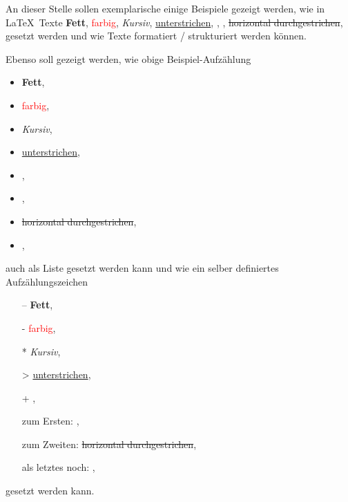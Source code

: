 An dieser Stelle sollen exemplarische einige Beispiele gezeigt werden, wie in \LaTeX\ Texte \textbf{Fett}, \textcolor{red}{farbig}, \textit{Kursiv}, \underline{unterstrichen}, , , \sout{horizontal durchgestrichen},  gesetzt werden und wie Texte formatiert / struk\-tu\-riert werden können.

Ebenso soll gezeigt werden, wie obige Beispiel-Aufzählung 

\begin{itemize}[topsep=0em, partopsep=0em, parsep=0em, itemsep=0em]
	\item \textbf{Fett}, 
	\item \textcolor{red}{farbig}, 
	\item \textit{Kursiv}, 
	\item \underline{unterstrichen}, 
	\item {}, 
	\item {}, 
	\item \sout{horizontal durchgestrichen}, 
	\item {},
\end{itemize}

auch als Liste gesetzt werden kann und wie ein selber definiertes Aufzählungszeichen 

\begin{itemize}[leftmargin=9em, topsep=0em, partopsep=0em, parsep=0em, itemsep=0em]
	\item[--]                 \textbf{Fett}, 
	\item[-]                  \textcolor{red}{farbig}, 
	\item[*]                  \textit{Kursiv}, 
	\item[\textgreater]       \underline{unterstrichen}, 
	\item[+]                  , 
	\item[zum Ersten:]        , 
	\item[zum Zweiten:]       \sout{horizontal durchgestrichen}, 
	\item[als letztes noch:]  ,
\end{itemize}

gesetzt werden kann.
